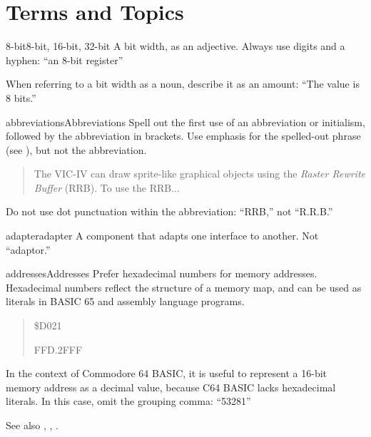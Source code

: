 
\chapter{Terms and Topics}
\label{cha:terms-and-topics}

\begin{sgentry}{8-bit}{8-bit, 16-bit, 32-bit}
    A bit width, as an adjective. Always use digits and a hyphen: ``an 8-bit register''

    When referring to a bit width as a noun, describe it as an amount: ``The value is 8 bits.''
\end{sgentry}

\begin{sgentry}{abbreviations}{Abbreviations}
    Spell out the first use of an abbreviation or initialism, followed by the abbreviation in brackets. Use emphasis for the spelled-out phrase (see ), but not the abbreviation.

    \begin{quote}
        The VIC-IV can draw sprite-like graphical objects using the \emph{Raster Rewrite Buffer} (RRB). To use the RRB...
    \end{quote}

    Do not use dot punctuation within the abbreviation: ``RRB,'' not ``R.R.B.''
\end{sgentry}

\begin{sgentry}{adapter}{adapter}
    A component that adapts one interface to another. Not ``adaptor.''
\end{sgentry}

\begin{sgentry}{addresses}{Addresses}
    Prefer hexadecimal numbers for memory addresses. Hexadecimal numbers reflect the structure of a memory map, and can be used as literals in BASIC 65 and assembly language programs.

    \begin{quote}
        \$D021

        FFD.2FFF
    \end{quote}

    In the context of Commodore 64 BASIC, it is useful to represent a 16-bit memory address as a decimal value, because C64 BASIC lacks hexadecimal literals. In this case, omit the grouping comma: ``53281''

    See also , , .
\end{sgentry}

